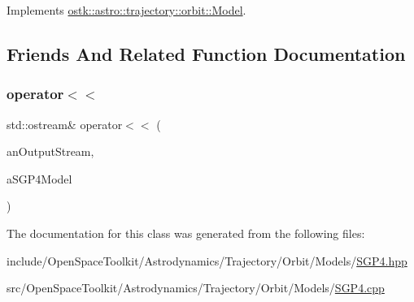 Implements \hyperlink{classostk_1_1astro_1_1trajectory_1_1orbit_1_1_model_a8ea45c1a6e51a6153ce3f72f5294f0c6}{ostk\+::astro\+::trajectory\+::orbit\+::\+Model}.



\subsection{Friends And Related Function Documentation}
\mbox{\label{classostk_1_1astro_1_1trajectory_1_1orbit_1_1models_1_1_s_g_p4_a44bd6a41f5d1be384d07b897785529f1}} 
\subsubsection{\texorpdfstring{operator$<$$<$}{operator<<}}
{\footnotesize\ttfamily std\+::ostream\& operator$<$$<$ (\begin{DoxyParamCaption}\item[{std\+::ostream \&}]{an\+Output\+Stream,  }\item[{const \hyperlink{classostk_1_1astro_1_1trajectory_1_1orbit_1_1models_1_1_s_g_p4}{S\+G\+P4} \&}]{a\+S\+G\+P4\+Model }\end{DoxyParamCaption})\hspace{0.3cm}{\ttfamily [friend]}}



The documentation for this class was generated from the following files\+:\begin{DoxyCompactItemize}
\item 
include/\+Open\+Space\+Toolkit/\+Astrodynamics/\+Trajectory/\+Orbit/\+Models/\hyperlink{_s_g_p4_8hpp}{S\+G\+P4.\+hpp}\item 
src/\+Open\+Space\+Toolkit/\+Astrodynamics/\+Trajectory/\+Orbit/\+Models/\hyperlink{_s_g_p4_8cpp}{S\+G\+P4.\+cpp}\end{DoxyCompactItemize}
